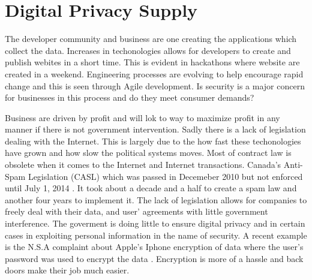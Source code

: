 \documentclass[12pt]{article}
\begin{document}
\section{Digital Privacy Supply}\label{sec:supply}

The developer community and business are one creating the applications which collect the data. Increases in techonologies allows for developers to create and publish webites in a short time. This is evident in hackathons where website are created in a weekend. Engineering processes are evolving to help encourage rapid change and this is seen through Agile development. Is security is a major concern for businesses in this process and do they meet consumer demands?

Business are driven by profit and will lok to way to maximize profit in any manner if there is not government intervention. Sadly there is a lack of legislation dealing with the Internet. This is largely due to the how fast these techonologies have grown and how slow the political systems moves. Most of contract law is obsolete when it comes to the Internet and Internet transactions. Canada's Anti-Spam Legislation (CASL) which was passed in Decemeber 2010 but not enforced until July 1, 2014 \cite{FastFacts}. It took about a decade and a half to create a spam law and another four years to implement it. The lack of legislation allows for companies to freely deal with their data, and user' agreements with little government interference. The goverment is doing little to ensure digital privacy and in certain cases in exploiting personal information in the name of security. A recent example is the N.S.A complaint about Apple's Iphone encryption of data where the user's password was used to encrypt the data \cite{Schneier}. Encryption is more of a hassle and back doors make their job much easier.
\end{document}
